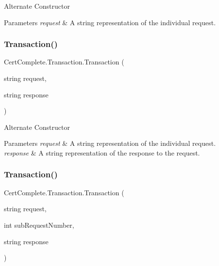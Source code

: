 Alternate Constructor 


\begin{DoxyParams}{Parameters}
{\em request} & A string representation of the individual request.\\
\hline
\end{DoxyParams}
\mbox{\label{class_cert_complete_1_1_transaction_a8802a829baacf5773d7e85f66d419c59}} 
\subsubsection{\texorpdfstring{Transaction()}{Transaction()}\hspace{0.1cm}{\footnotesize\ttfamily [3/4]}}
{\footnotesize\ttfamily Cert\+Complete.\+Transaction.\+Transaction (\begin{DoxyParamCaption}\item[{string}]{request,  }\item[{string}]{response }\end{DoxyParamCaption})\hspace{0.3cm}{\ttfamily [inline]}}



Alternate Constructor 


\begin{DoxyParams}{Parameters}
{\em request} & A string representation of the individual request.\\
\hline
{\em response} & A string representation of the response to the request.\\
\hline
\end{DoxyParams}
\mbox{\label{class_cert_complete_1_1_transaction_a4256176bcd42868e04a1382b6ca6416e}} 
\subsubsection{\texorpdfstring{Transaction()}{Transaction()}\hspace{0.1cm}{\footnotesize\ttfamily [4/4]}}
{\footnotesize\ttfamily Cert\+Complete.\+Transaction.\+Transaction (\begin{DoxyParamCaption}\item[{string}]{request,  }\item[{int}]{sub\+Request\+Number,  }\item[{string}]{response }\end{DoxyParamCaption})\hspace{0.3cm}{\ttfamily [inline]}}



